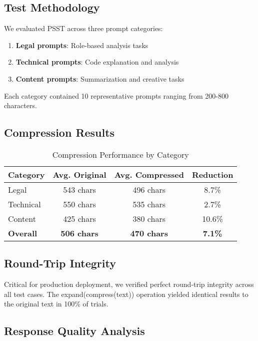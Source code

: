 \documentclass[11pt,twocolumn]{article}
\begin{document}
\subsection{Test Methodology}

We evaluated PSST across three prompt categories:

\begin{enumerate}
\item \textbf{Legal prompts}: Role-based analysis tasks
\item \textbf{Technical prompts}: Code explanation and analysis
\item \textbf{Content prompts}: Summarization and creative tasks
\end{enumerate}

Each category contained 10 representative prompts ranging from 200-800 characters.

\subsection{Compression Results}

\begin{table}[h]
\centering
\begin{tabular}{|l|c|c|c|}
\hline
\textbf{Category} & \textbf{Avg. Original} & \textbf{Avg. Compressed} & \textbf{Reduction} \\
\hline
Legal & 543 chars & 496 chars & 8.7\% \\
Technical & 550 chars & 535 chars & 2.7\% \\
Content & 425 chars & 380 chars & 10.6\% \\
\hline
\textbf{Overall} & \textbf{506 chars} & \textbf{470 chars} & \textbf{7.1\%} \\
\hline
\end{tabular}
\caption{Compression Performance by Category}
\end{table}

\subsection{Round-Trip Integrity}

Critical for production deployment, we verified perfect round-trip integrity across all test cases. The expand(compress(text)) operation yielded identical results to the original text in 100\% of trials.

\subsection{Response Quality Analysis}
\end{document}
